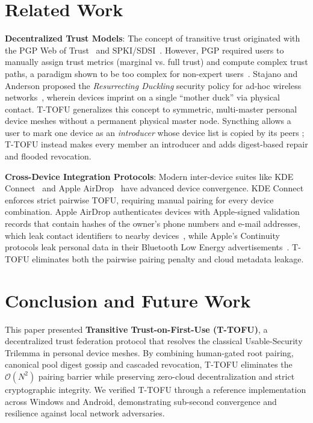 \documentclass[conference,a4paper]{IEEEtran}
\begin{document}
\section{Related Work}
\textbf{Decentralized Trust Models}: The concept of transitive trust originated with the PGP Web of Trust~\cite{zimmermann1995official} and SPKI/SDSI~\cite{rfc2693}. However, PGP required users to manually assign trust metrics (marginal vs. full trust) and compute complex trust paths, a paradigm shown to be too complex for non-expert users~\cite{whitten1999johnny}. Stajano and Anderson proposed the \textit{Resurrecting Duckling} security policy for ad-hoc wireless networks~\cite{stajano2000duckling}, wherein devices imprint on a single ``mother duck'' via physical contact. T-TOFU generalizes this concept to symmetric, multi-master personal device meshes without a permanent physical master node. Syncthing allows a user to mark one device as an \textit{introducer} whose device list is copied by its peers \cite{syncthingintroducer}; T-TOFU instead makes every member an introducer and adds digest-based repair and flooded revocation.

\textbf{Cross-Device Integration Protocols}: Modern inter-device suites like KDE Connect~\cite{kdeconnect} and Apple AirDrop~\cite{heinrich2021privatedrop} have advanced device convergence. KDE Connect enforces strict pairwise TOFU, requiring manual pairing for every device combination. Apple AirDrop authenticates devices with Apple-signed validation records that contain hashes of the owner's phone numbers and e-mail addresses, which leak contact identifiers to nearby devices~\cite{heinrich2021privatedrop}, while Apple's Continuity protocols leak personal data in their Bluetooth Low Energy advertisements~\cite{celosia2020discontinued}. T-TOFU eliminates both the pairwise pairing penalty and cloud metadata leakage.

\section{Conclusion and Future Work}
This paper presented \textbf{Transitive Trust-on-First-Use (T-TOFU)}, a decentralized trust federation protocol that resolves the classical Usable-Security Trilemma in personal device meshes. By combining human-gated root pairing, canonical pool digest gossip and cascaded revocation, T-TOFU eliminates the $\mathcal{O}(N^2)$ pairing barrier while preserving zero-cloud decentralization and strict cryptographic integrity. We verified T-TOFU through a reference implementation across Windows and Android, demonstrating sub-second convergence and resilience against local network adversaries.
\end{document}
